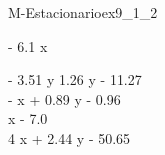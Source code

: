 
\begin{bilevelmodel}{M-Estacionario}{ex9_1_2}
    \begin{upperlevel}{- 6.1 x}{
        
    }
    \end{upperlevel}
    \begin{lowerlevel}{- 3.51 y}{
         1.26 y - 11.27  \\ 
 - x + 0.89 y - 0.96  \\ 
 x - 7.0  \\ 
 4 x + 2.44 y - 50.65 
    }
    \end{lowerlevel}
\end{bilevelmodel}
    
        